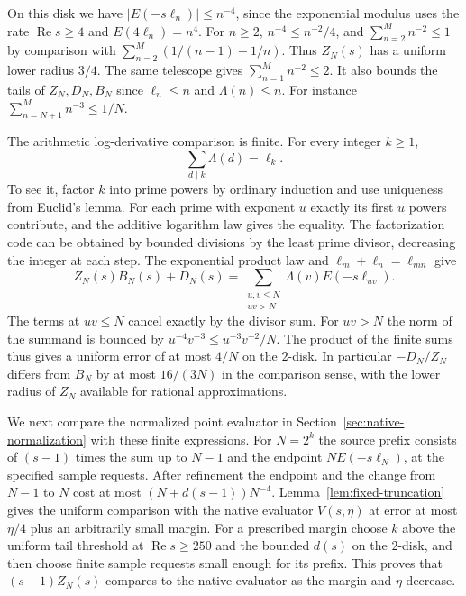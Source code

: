 \documentclass[11pt]{amsart}
\theoremstyle{definition}
\theoremstyle{remark}
\numberwithin{equation}{section}
\newcommand{\re}{\operatorname{Re}}
\begin{document}
On this disk we have
\(|E(-s\ell_n)|\le n^{-4}\), since the exponential modulus
uses the rate \(\re s\ge4\) and \(E(4\ell_n)=n^4\).
For \(n\ge2\), \(n^{-4}\le n^{-2}/4\), and
\(\sum_{n=2}^M n^{-2}\le1\) by comparison with
\(\sum_{n=2}^M (1/(n-1)-1/n)\).
Thus \(Z_N(s)\) has a uniform lower radius \(3/4\).
The same telescope gives \(\sum_{n=1}^M n^{-2}\le2\).
It also bounds the tails of \(Z_N,D_N,B_N\) since
\(\ell_n\le n\) and \(\Lambda(n)\le n\). For instance
\(\sum_{n=N+1}^M n^{-3}\le1/N\).

The arithmetic log-derivative comparison is finite.
For every integer \(k\ge1\),
\[
                 \sum_{d\mid k}\Lambda(d)=\ell_k .
\]
To see it, factor \(k\) into prime powers by ordinary
induction and use uniqueness from Euclid's lemma.
For each prime with exponent \(u\) exactly its first \(u\)
powers contribute, and the additive logarithm law gives
the equality. The factorization code can be obtained by
bounded divisions by the least prime divisor, decreasing
the integer at each step.
The exponential product law and \(\ell_m+\ell_n=\ell_{mn}\)
give
\[
 Z_N(s)B_N(s)+D_N(s)
   =\sum_{\substack{u,v\le N\\uv>N}}\Lambda(v)E(-s\ell_{uv}).
\]
The terms at \(uv\le N\) cancel exactly by the divisor sum.
For \(uv>N\) the norm of the summand is bounded by
\(u^{-4}v^{-3}\le u^{-3}v^{-2}/N\).
The product of the finite sums thus gives a uniform error
of at most \(4/N\) on the \(2\)-disk. In particular
\(-D_N/Z_N\) differs from \(B_N\) by at most \(16/(3N)\)
in the comparison sense, with the lower radius of \(Z_N\)
available for rational approximations.

We next compare the normalized point evaluator in
Section~\ref{sec:native-normalization} with these finite
expressions. For \(N=2^k\) the source prefix consists of
\((s-1)\) times the sum up to \(N-1\) and the endpoint
\(N E(-s\ell_N)\), at the specified sample requests.
After refinement the endpoint and the change from \(N-1\)
to \(N\) cost at most \((N+d(s-1))N^{-4}\).
Lemma~\ref{lem:fixed-truncation} gives the uniform comparison
with the native evaluator \(V(s,\eta)\) at error at most
\(\eta/4\) plus an arbitrarily small margin.
For a prescribed margin choose \(k\) above the uniform
tail threshold at \(\re s\ge250\) and the bounded
\(d(s)\) on the \(2\)-disk, and then choose finite sample
requests small enough for its prefix. This proves that
\((s-1)Z_N(s)\) compares to the native evaluator as
the margin and \(\eta\) decrease.
\end{document}
